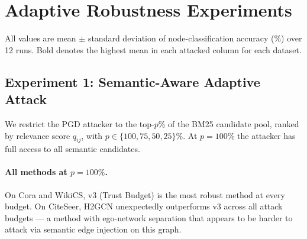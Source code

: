 \documentclass{article}
\begin{document}
\section{Adaptive Robustness Experiments}

All values are mean $\pm$ standard deviation of node-classification accuracy
(\%) over 12 runs. Bold denotes the highest mean in each attacked column for
each dataset.

\subsection{Experiment 1: Semantic-Aware Adaptive Attack}
\label{sec:exp1}

We restrict the PGD attacker to the top-$p$\% of the BM25 candidate pool,
ranked by relevance score $q_{ij}$, with $p \in \{100, 75, 50, 25\}$\%.
At $p{=}100\%$ the attacker has full access to all semantic candidates.

\paragraph{All methods at $p{=}100\%$.}
On Cora and WikiCS, v3 (Trust Budget) is the most robust method at every
budget. On CiteSeer, H2GCN unexpectedly outperforms v3 across all attack
budgets — a method with ego-network separation that appears to be harder
to attack via semantic edge injection on this graph.
\end{document}
